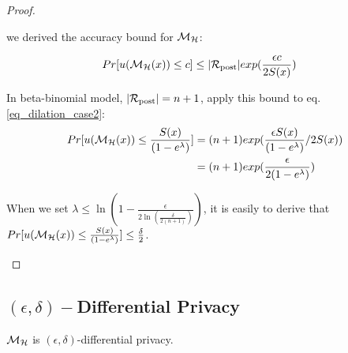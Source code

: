 \documentclass[sigconf]{acmart}
\begin{document}
\begin{proof}
\begin{itemize}
		we derived the accuracy bound for $\mathcal{M}_{\mathcal{H}}$:

		\begin{equation*}
		\begin{split}
		Pr[u(\mathcal{M}_{\mathcal{H}}(x)) \leq c] 
		& \leq |\mathcal{R}_{\textup{post}}|exp(\frac{\epsilon c}{2 S(x)})
		\end{split}
		\end{equation*}

		In beta-binomial model, $|\mathcal{R}_{\textup{post}}| = n + 1$, apply this bound to eq. \ref{eq_dilation_case2}:
		\begin{equation*}
		\begin{split}
		Pr[u(\mathcal{M}_{\mathcal{H}}(x)) \leq \frac{S(x)}{(1 - e ^ {\lambda})}] 
		& = (n + 1)exp(\frac{\epsilon S(x)}{(1 - e ^ {\lambda})}/2 S(x))\\
		& = (n + 1)exp(\frac{\epsilon}{2 (1 - e ^ {\lambda})})\\
		\end{split}
		\end{equation*}

		When we set $\lambda \leq \ln(1 - \frac{\epsilon}{2 \ln (\frac{\delta}{2 (n + 1)})})$, it is easily to derive that $Pr[u(\mathcal{M}_{\mathcal{H}}(x)) \leq \frac{S(x)}{(1 - e ^ {\lambda})}] \leq \frac{\delta}{2}$.

\end{itemize}

\end{proof}

\subsection{$(\epsilon, \delta)-$Differential Privacy}
\begin{lem}
\label{lem_hexpmech_privacy}
$\mathcal{M}_{\mathcal{H}}$ is $(\epsilon, \delta)$-differential privacy.
\end{lem}
\end{document}
